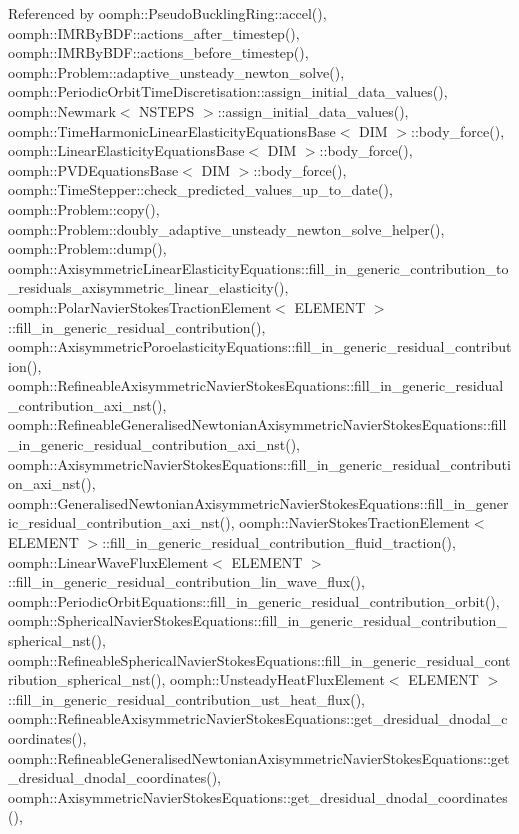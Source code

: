 Referenced by oomph\+::\+Pseudo\+Buckling\+Ring\+::accel(), oomph\+::\+I\+M\+R\+By\+B\+D\+F\+::actions\+\_\+after\+\_\+timestep(), oomph\+::\+I\+M\+R\+By\+B\+D\+F\+::actions\+\_\+before\+\_\+timestep(), oomph\+::\+Problem\+::adaptive\+\_\+unsteady\+\_\+newton\+\_\+solve(), oomph\+::\+Periodic\+Orbit\+Time\+Discretisation\+::assign\+\_\+initial\+\_\+data\+\_\+values(), oomph\+::\+Newmark$<$ N\+S\+T\+E\+P\+S $>$\+::assign\+\_\+initial\+\_\+data\+\_\+values(), oomph\+::\+Time\+Harmonic\+Linear\+Elasticity\+Equations\+Base$<$ D\+I\+M $>$\+::body\+\_\+force(), oomph\+::\+Linear\+Elasticity\+Equations\+Base$<$ D\+I\+M $>$\+::body\+\_\+force(), oomph\+::\+P\+V\+D\+Equations\+Base$<$ D\+I\+M $>$\+::body\+\_\+force(), oomph\+::\+Time\+Stepper\+::check\+\_\+predicted\+\_\+values\+\_\+up\+\_\+to\+\_\+date(), oomph\+::\+Problem\+::copy(), oomph\+::\+Problem\+::doubly\+\_\+adaptive\+\_\+unsteady\+\_\+newton\+\_\+solve\+\_\+helper(), oomph\+::\+Problem\+::dump(), oomph\+::\+Axisymmetric\+Linear\+Elasticity\+Equations\+::fill\+\_\+in\+\_\+generic\+\_\+contribution\+\_\+to\+\_\+residuals\+\_\+axisymmetric\+\_\+linear\+\_\+elasticity(), oomph\+::\+Polar\+Navier\+Stokes\+Traction\+Element$<$ E\+L\+E\+M\+E\+N\+T $>$\+::fill\+\_\+in\+\_\+generic\+\_\+residual\+\_\+contribution(), oomph\+::\+Axisymmetric\+Poroelasticity\+Equations\+::fill\+\_\+in\+\_\+generic\+\_\+residual\+\_\+contribution(), oomph\+::\+Refineable\+Axisymmetric\+Navier\+Stokes\+Equations\+::fill\+\_\+in\+\_\+generic\+\_\+residual\+\_\+contribution\+\_\+axi\+\_\+nst(), oomph\+::\+Refineable\+Generalised\+Newtonian\+Axisymmetric\+Navier\+Stokes\+Equations\+::fill\+\_\+in\+\_\+generic\+\_\+residual\+\_\+contribution\+\_\+axi\+\_\+nst(), oomph\+::\+Axisymmetric\+Navier\+Stokes\+Equations\+::fill\+\_\+in\+\_\+generic\+\_\+residual\+\_\+contribution\+\_\+axi\+\_\+nst(), oomph\+::\+Generalised\+Newtonian\+Axisymmetric\+Navier\+Stokes\+Equations\+::fill\+\_\+in\+\_\+generic\+\_\+residual\+\_\+contribution\+\_\+axi\+\_\+nst(), oomph\+::\+Navier\+Stokes\+Traction\+Element$<$ E\+L\+E\+M\+E\+N\+T $>$\+::fill\+\_\+in\+\_\+generic\+\_\+residual\+\_\+contribution\+\_\+fluid\+\_\+traction(), oomph\+::\+Linear\+Wave\+Flux\+Element$<$ E\+L\+E\+M\+E\+N\+T $>$\+::fill\+\_\+in\+\_\+generic\+\_\+residual\+\_\+contribution\+\_\+lin\+\_\+wave\+\_\+flux(), oomph\+::\+Periodic\+Orbit\+Equations\+::fill\+\_\+in\+\_\+generic\+\_\+residual\+\_\+contribution\+\_\+orbit(), oomph\+::\+Spherical\+Navier\+Stokes\+Equations\+::fill\+\_\+in\+\_\+generic\+\_\+residual\+\_\+contribution\+\_\+spherical\+\_\+nst(), oomph\+::\+Refineable\+Spherical\+Navier\+Stokes\+Equations\+::fill\+\_\+in\+\_\+generic\+\_\+residual\+\_\+contribution\+\_\+spherical\+\_\+nst(), oomph\+::\+Unsteady\+Heat\+Flux\+Element$<$ E\+L\+E\+M\+E\+N\+T $>$\+::fill\+\_\+in\+\_\+generic\+\_\+residual\+\_\+contribution\+\_\+ust\+\_\+heat\+\_\+flux(), oomph\+::\+Refineable\+Axisymmetric\+Navier\+Stokes\+Equations\+::get\+\_\+dresidual\+\_\+dnodal\+\_\+coordinates(), oomph\+::\+Refineable\+Generalised\+Newtonian\+Axisymmetric\+Navier\+Stokes\+Equations\+::get\+\_\+dresidual\+\_\+dnodal\+\_\+coordinates(), oomph\+::\+Axisymmetric\+Navier\+Stokes\+Equations\+::get\+\_\+dresidual\+\_\+dnodal\+\_\+coordinates(), 